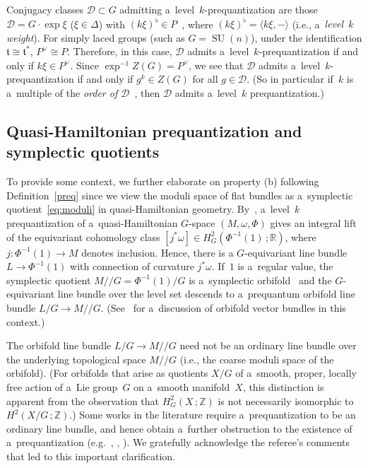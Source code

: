 \documentclass[pdftex]{sigma}
\numberwithin{equation}{section}
\DeclareMathOperator{\SU}{SU}
\begin{document}
\begin{Example}
Conjugacy classes $\mathcal{D} \subset G$ admitting a~level~$k$-prequantization are those $\mathcal{D}=G\cdot \exp \xi$
($\xi \in \Delta$) with $(k\xi)^\flat \in P$~\cite{BasicGerbe}, where $(k\xi)^\flat = \langle k\xi,- \rangle$ (i.e., a~\emph{level~$k$ weight}).
For simply laced groups (such as $G=\SU(n)$), under the identif\/ication $\mathfrak{t} \cong \mathfrak{t}^*$, $P^\vee
\cong P$.
Therefore, in this case, $\mathcal{D}$ admits a~level~$k$-prequantization if and only if $k\xi \in P^\vee$.
Since $\exp^{-1} Z(G) = P^\vee$, we see that $\mathcal{D}$ admits a~level~$k$-prequantization if and only if $g^k \in
Z(G)$ for all $g \in \mathcal{D}$.
(So in particular if~$k$ is a~multiple of the \emph{order of $\mathcal{D}$}~\cite[Def\/inition 5.76]{BL}, then
$\mathcal{D}$ admits a~level~$k$ prequantization.)
\end{Example}

\subsection{Quasi-Hamiltonian prequantization and symplectic quotients}\label{pqbundle}

To provide some context, we further elaborate on property (b) following Def\/inition~\ref{preq} since we view the moduli
space of f\/lat bundles as a~symplectic quotient~\eqref{eq:moduli} in quasi-Hamiltonian geometry.
By~\cite[Proposition~3.6]{JGP}, a~level~$k$ prequantization of a~quasi-Hamiltonian $G$-space $(M,\omega,\Phi)$ gives
an integral lift of the equivariant cohomology class $[j^*\omega] \in H^2_G(\Phi^{-1}(1)\,;{\mathbb{R}})$, where
$j:\Phi^{-1}(1) \to M$ denotes inclusion.
Hence, there is a $G$-equivariant line bundle $L\to \Phi^{-1}(1)$ with connection of curvature $j^*\omega$.
If~$1$ is a~regular value, the symplectic quotient $M/ /G= \Phi^{-1}(1)/G$ is a~symplectic orbifold~\cite{AMM} and
the $G$-equivariant line bundle over the level set descends to a~prequantum orbifold line bundle $L/G \to M/ /G$.
(See~\cite[Example 2.29]{Adem} for a~discussion of orbifold vector bundles in this context.)

\begin{Remark}
The orbifold line bundle $L/G\to M/ /G$ need not be an ordinary line bundle over the underlying topological space $M/
/G$ (i.e., the coarse moduli space of the orbifold).
(For orbifolds that arise as quotients $X/G$ of a~smooth, proper, locally free action of a~Lie group~$G$ on a~smooth
manifold~$X$, this distinction is apparent from the observation that $H_G^2(X\,;{\mathbb{Z}})$ is not necessarily
isomorphic to $H^2(X/G\,;{\mathbb{Z}})$.) Some works in the literature require a~prequantization to be an ordinary line
bundle, and hence obtain a~further obstruction to the existence of a~prequantization (e.g.~\cite[Theorem 4.2]{Ko},
\cite[Theorems~4.12 and~6.1]{DW}, \cite[Lemme~3.2]{Pa}).
We gratefully acknowledge the referee's comments that led to this important clarif\/ication.
\end{Remark}
\end{document}
